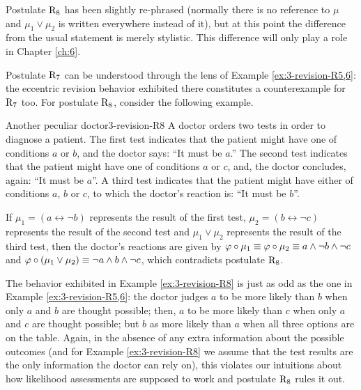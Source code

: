 Postulate $\mathrm{R}_{8}$ has been slightly re-phrased
(normally there is no reference to $\mu$ 
and $\mu_{1}\lor\mu_{2}$ is written everywhere instead of it),
but at this point the difference from the usual statement 
is merely stylistic. 
This difference will only play a role in Chapter \ref{ch:6}.

Postulate $\mathrm{R}_{7}$ can be understood through the lens of Example \ref{ex:3-revision-R5,6}:
the eccentric revision behavior exhibited there constitutes a counterexample for $\mathrm{R}_{7}$ too.
For postulate $\mathrm{R}_{8}$, consider the following example.

\begin{xmpl}{Another peculiar doctor}{3-revision-R8}
	A doctor orders two tests in order to diagnose a patient.
	The first test indicates that the patient might have one of conditions $a$ or $b$,
	and the doctor says: ``It must be $a$.''
	The second test indicates that the patient might have one of conditions $a$ or $c$,
	and, the doctor concludes, again: ``It must be $a$''.
	A third test indicates that the patient might have either of conditions $a$, $b$ or $c$,
	to which the doctor's reaction is: ``It must be $b$''.
	
	If $\mu_1=(a\leftrightarrow\lnot b)$ represents the result of the first test,
	$\mu_2=(b\leftrightarrow\lnot c)$ represents the result of the second test
	and $\mu_1\lor\mu_2$ represents the result of the third test, 
	then the doctor's reactions are given by 
	$
		\varphi \circ \mu_1 
			\equiv
		\varphi \circ \mu_2 
			\equiv 
		a\land\lnot b\land\lnot c
	$
	and
	$
		\varphi\circ (\mu_1\lor \mu_2) 
			\equiv
		\lnot a \land b\land \lnot c
	$,
	which contradicts postulate $\mathrm{R}_{8}$.
\end{xmpl}

The behavior exhibited in Example \ref{ex:3-revision-R8} is just as odd
as the one in Example \ref{ex:3-revision-R5,6}: 
the doctor judges $a$ to be more likely than $b$ when only $a$ and $b$ are thought possible;
then, $a$ to be more likely than $c$ when only $a$ and $c$ are thought possible;
but $b$ as more likely than $a$ when all three options are on the table.
Again, in the absence of any extra information about the possible outcomes 
(and for Example \ref{ex:3-revision-R8} we assume that the test results are the only information the doctor can rely on),
this violates our intuitions about how likelihood assessments are supposed to work
and postulate $\mathrm{R}_{8}$ rules it out.

